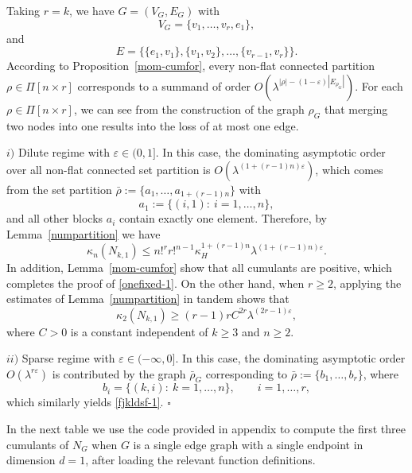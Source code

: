 \documentclass[12pt]{article}
\newenvironment{Proof}{\removelastskip\par\medskip
\noindent{\em Proof.} \rm}{\penalty-20\null\hfill$\square$\par\medbreak}
\numberwithin{equation}{section}
\begin{document}
\begin{Proof}
 Taking $r=k$, we have $G=(V_G,E_G)$ with 
$$V_G=\{v_1, \ldots ,v_r,e_1\},$$
and 
$$E=\{\{e_1,v_1\},\{v_1,v_2\}, \ldots ,\{v_{r-1},v_r\}\}.$$
According to Proposition~\ref{mom-cumfor}, every non-flat connected partition $\rho\in\Pi[n\times r]$ corresponds to a summand of order $O(\lambda^{|\rho|-( 1 - \varepsilon ) |E_{\rho_G}|})$. 
For each $\rho\in\Pi[n\times r]$, we can see from the construction of
the graph $\rho_G$ that merging two nodes into one results into the loss of at most one edge.
 
\noindent $i)$ Dilute regime with $\varepsilon \in (0,1]$.
  In this case, the dominating asymptotic order over all non-flat connected set partition is $O(\lambda^{ ( 1+(r-1)n ) \varepsilon })$, which comes from the set partition $\bar{\rho}:=\{a_1, \ldots ,a_{1+(r-1)n}\}$ with 
$$a_1:=\{(i,1):~i=1, \ldots ,n\},$$
   and all other blocks $a_i$ contain exactly one element.
   Therefore, by Lemma~\ref{numpartition} we have
$$
   \kappa_n(N_{k,1}) \leq 
  n!^rr!^{n-1}
   \kappa_H^{1+(r-1)n} \lambda^{( 1+(r-1)n )\varepsilon }.
$$
 In addition, Lemma~\ref{mom-cumfor} show
 that all cumulants are positive,
 which completes the proof of \eqref{onefixed-1}. 
 On the other hand, when $r\geq 2$, applying the estimates
 of Lemma~\ref{numpartition} in tandem shows that 
\begin{equation}
\nonumber
\kappa_2(N_{k,1})\geq (r-1)rC^{2r} \lambda^{(2r-1)\varepsilon},
\end{equation}
 where $C>0$ is a constant independent of $k \geq 3$ and $n \geq 2$.

\noindent
$ii)$
Sparse regime with $\varepsilon \in (-\infty , 0]$.
In this case, the dominating asymptotic order  $O(\lambda^{ r \varepsilon })$ is contributed by the graph $\bar{\rho}_G$ corresponding to $\bar{\rho}:=\{b_1, \ldots ,b_r\}$, where 
$$b_i=\{(k,i):~k=1, \ldots ,n\}, \qquad  i=1, \ldots ,r,
$$
 which similarly yields \eqref{fjkldsf-1}.  
\end{Proof}
In the next table we use the code provided
in appendix to compute the first three cumulants of $N_G$ when $G$ is
a single edge graph with a single endpoint in dimension $d=1$,  
after loading the relevant function definitions. 
\end{document}
